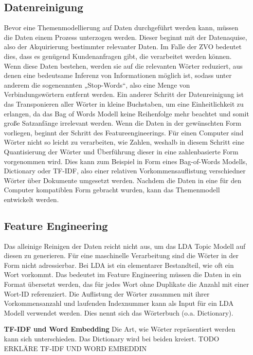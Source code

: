 \documentclass[german,version-2020-11]{uzl-thesis}
\begin{document}
\subsection{Datenreinigung}
Bevor eine Themenmodellierung auf Daten durchgeführt werden kann, müssen die Daten einem Prozess unterzogen werden. Dieser beginnt mit der Datenaquise, also der Akquirierung bestimmter relevanter Daten. Im Falle der ZVO bedeutet dies, dass es genügend Kundenanfragen gibt, die verarbeitet werden können. Wenn diese Daten bestehen, werden sie auf die relevanten Wörter reduziert, aus denen eine bedeutsame Inferenz von Informationen möglich ist, sodass unter anderem die sogeneannten „Stop-Words“, also eine Menge von Verbindungswörtern entfernt werden. Ein anderer Schritt der Datenreinigung ist das Transponieren aller Wörter in kleine Buchstaben, um eine Einheitlichkeit zu erlangen, da das Bag of Words Modell keine Reihenfolge mehr beachtet und somit große Satzanfänge irrelevant werden. Wenn die Daten in der gewünschten Form vorliegen, beginnt der Schritt des Featureengineerings. Für einen Computer sind Wörter nicht so leicht zu verarbeiten, wie Zahlen, weshalb in diesem Schritt eine Quantisierung der Wörter und Überführung dieser in eine zahlenbasierte Form vorgenommen wird. Dies kann zum Beispiel in Form eines Bag-of-Words Modells, Dictionary oder TF-IDF, also einer relativen Vorkommensauflistung verschiedner Wörter über Dokumente umgesetzt werden. Nachdem die Daten in eine für den Computer kompatiblen Form gebracht wurden, kann das Themenmodell entwickelt werden. 

\subsection{Feature Engineering}
Das alleinige Reinigen der Daten reicht nicht aus, um das LDA Topic Modell auf diesen zu generieren. Für eine maschinelle Verarbeitung sind die Wörter in der Form nicht adressierbar. Bei LDA ist ein elementarer Bestandteil, wie oft ein Wort vorkommt. Das bedeutet im Feature Engineering müssen die Daten in ein Format übersetzt werden, das für jedes Wort ohne Duplikate die Anzahl mit einer Wort-ID referenziert. Die Auflistung der Wörter zusammen mit ihrer Vorkommensanzahl und laufenden Indexnummer kann als Input für ein LDA Modell verwendet werden. Dies nennt sich das Wörterbuch (o.a. Dictionary). 

\textbf{TF-IDF und Word Embedding}
Die Art, wie Wörter repräsentiert werden kann sich unterschieden. Das Dictionary wird bei beiden kreiert. TODO ERKLÄRE TF-IDF UND WORD EMBEDDIN
\end{document}
